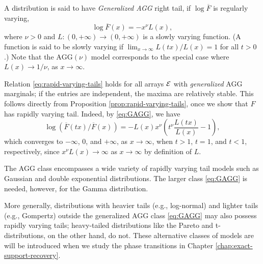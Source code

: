 \begin{example} \label{exmp:AGG}
A distribution is said to have \emph{Generalized AGG} right tail, if $\log{\overline{F}}$ is regularly varying,
\begin{equation} \label{eq:GAGG}
    \log{\overline{F}(x)} = - x^\nu L(x),
\end{equation}
where $\nu>0$ and $L: (0,+\infty)\to(0,+\infty)$ is a slowly varying function. (A function is said to be slowly varying if $\lim_{x\to\infty}L(tx)/L(x) = 1$ for all $t>0$.) Note that the $\text{AGG}(\nu)$ model corresponds to the special case where $L(x)\to 1/\nu$, as $x\to\infty$.

Relation \eqref{eq:rapid-varying-tails} holds for all arrays $\cal E$ with \emph{generalized} AGG marginals; if the entries are independent, the maxima are relatively stable. 
This follows directly from Proposition \ref{prop:rapid-varying-tails}, once we show that $F$ has rapidly varying tail. 
Indeed, by \eqref{eq:GAGG}, we have
$$
\log{\left(\overline{F}(tx)\Big/ \overline{F}(x)\right)} = - L(x)x^\nu\left(t^\nu\frac{L(tx)}{L(x)} - 1\right),
$$
which converges to $-\infty$, 0, and $+\infty$, as $x\to\infty$, when $t>1$, $t=1$, and $t<1$, respectively, since $x^\nu L(x)\to\infty$ as $x\to\infty$ by definition of $L$.
\end{example}


The \ac{AGG} class encompasses a wide variety of rapidly varying tail models such as Gaussian and double exponential distributions. The larger class \eqref{eq:GAGG} is needed, however, for the Gamma distribution.

More generally, distributions with heavier tails (e.g., log-normal) and lighter tails (e.g., Gompertz) outside the generalized AGG class \eqref{eq:GAGG} may also possess rapidly varying tails;
heavy-tailed distributions like the Pareto and t-distributions, on the other hand, do not.
These alternative classes of models are will be introduced when we study the phase transitions in Chapter \ref{chap:exact-support-recovery}. 


